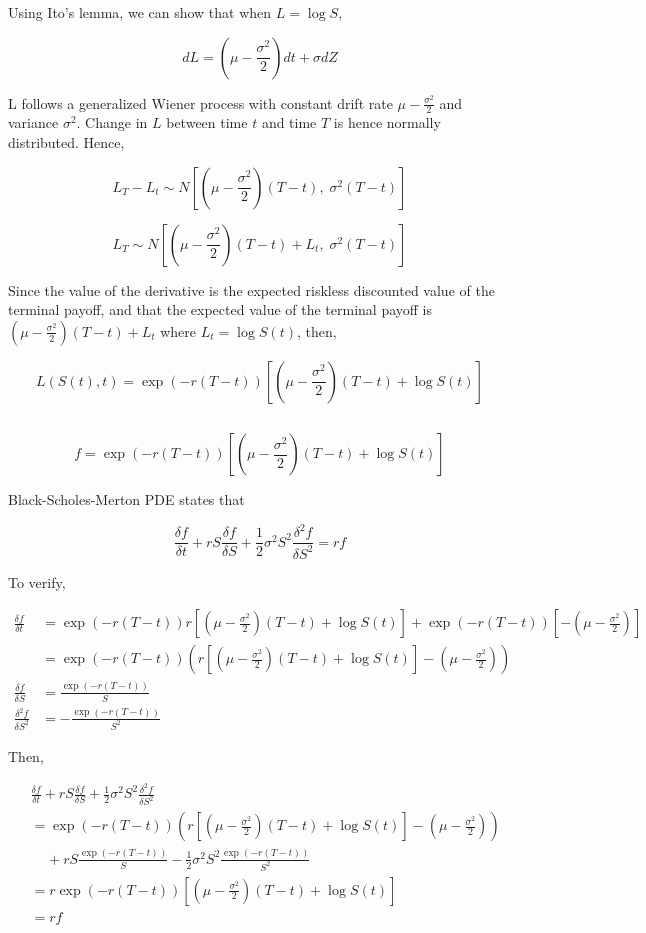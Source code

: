 \documentclass[11pt]{scrartcl}
\newcommand{\defrac}[2]{\ensuremath{\frac{\delta #1}{\delta #2}}}
\newcommand{\dedefrac}[2]{\ensuremath{\frac{\delta^2 #1}{\delta #2^2}}}
\begin{document}
Using Ito's lemma, we can show that when $L = \log{S}$,

\[dL = \left(\mu - \frac{\sigma^2}{2}\right)dt + \sigma dZ\]

L follows a generalized Wiener process with constant drift rate $\mu - \frac{\sigma^2}{2}$ and variance $\sigma^2$. Change in $L$ between time $t$ and time $T$ is hence normally distributed. Hence,

\[L_T - L_t \sim N\left[\left(\mu-\frac{\sigma^2}{2}\right)(T-t), \; \sigma^2(T-t)\right]\]

\[L_T \sim N\left[\left(\mu-\frac{\sigma^2}{2}\right)(T-t) + L_t, \; \sigma^2(T-t)\right]\]

Since the value of the derivative is the expected riskless discounted value of the terminal payoff, and that the expected value of the terminal payoff is $\left(\mu-\frac{\sigma^2}{2}\right)(T-t) + L_t$ where $L_t = \log{S(t)}$, then,

\[L(S(t), t) = \exp{(-r(T-t))}\left[ \left(\mu-\frac{\sigma^2}{2}\right)(T-t) + \log{S(t)}\right]\]

\subsection{}

\[f = \exp{(-r(T-t))}\left[ \left(\mu-\frac{\sigma^2}{2}\right)(T-t) + \log{S(t)}\right]\]

Black-Scholes-Merton PDE states that

\[\defrac{f}{t} + rS \defrac{f}{S} + \frac{1}{2}\sigma^2 S^2 \dedefrac{f}{S} = rf\]

To verify,

\begin{align*}
\defrac{f}{t} &= \exp{(-r(T-t))}r\left[\left(\mu-\frac{\sigma^2}{2}\right)(T-t) + \log{S(t)}\right] + \exp{(-r(T-t))}\left[-\left(\mu-\frac{\sigma^2}{2}\right)\right] \\
&= \exp{(-r(T-t))}\left(r\left[\left(\mu-\frac{\sigma^2}{2}\right)(T-t) + \log{S(t)}\right] - \left(\mu-\frac{\sigma^2}{2}\right)\right) \\
\defrac{f}{S} &= \frac{\exp{(-r(T-t))}}{S} \\
\dedefrac{f}{S} &= -\frac{\exp{(-r(T-t))}}{S^2}
\end{align*}

Then,

\begin{align*}
&\defrac{f}{t} + rS \defrac{f}{S} + \frac{1}{2}\sigma^2 S^2 \dedefrac{f}{S} \\
&= \exp{(-r(T-t))}\left(r\left[\left(\mu-\frac{\sigma^2}{2}\right)(T-t) + \log{S(t)}\right] - \left(\mu-\frac{\sigma^2}{2}\right)\right) \\
&\;\;\;\;+ rS\frac{\exp{(-r(T-t))}}{S} - \frac{1}{2}\sigma^2S^2\frac{\exp{(-r(T-t))}}{S^2} \\
&= r \exp{(-r(T-t))}\left[ \left(\mu-\frac{\sigma^2}{2}\right)(T-t) + \log{S(t)}\right] \\
&= rf
\end{align*}
\end{document}
